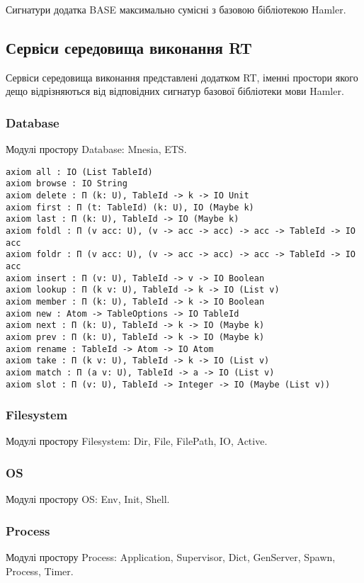 Сигнатури додатка BASE максимально сумісні з базовою бібліотекою Hamler.

\subsection{Сервіси середовища виконання RT}
Сервіси середовища виконання представлені додатком RT, іменні простори якого
дещо відрізняються від відповідних сигнатур базової бібліотеки мови Hamler.

\subsubsection{Database}
Модулі простору Database: Mnesia, ETS.

\begin{lstlisting}[mathescape=true]
axiom all : IO (List TableId)
axiom browse : IO String
axiom delete : Π (k: U), TableId -> k -> IO Unit
axiom first : Π (t: TableId) (k: U), IO (Maybe k)
axiom last : Π (k: U), TableId -> IO (Maybe k)
axiom foldl : Π (v acc: U), (v -> acc -> acc) -> acc -> TableId -> IO acc
axiom foldr : Π (v acc: U), (v -> acc -> acc) -> acc -> TableId -> IO acc
axiom insert : Π (v: U), TableId -> v -> IO Boolean
axiom lookup : Π (k v: U), TableId -> k -> IO (List v)
axiom member : Π (k: U), TableId -> k -> IO Boolean
axiom new : Atom -> TableOptions -> IO TableId
axiom next : Π (k: U), TableId -> k -> IO (Maybe k)
axiom prev : Π (k: U), TableId -> k -> IO (Maybe k)
axiom rename : TableId -> Atom -> IO Atom
axiom take : Π (k v: U), TableId -> k -> IO (List v)
axiom match : Π (a v: U), TableId -> a -> IO (List v)
axiom slot : Π (v: U), TableId -> Integer -> IO (Maybe (List v))
\end{lstlisting}

\subsubsection{Filesystem}
Модулі простору Filesystem: Dir, File, FilePath, IO, Active.

\subsubsection{OS}
Модулі простору OS: Env, Init, Shell.

\subsubsection{Process}
Модулі простору Process: Application, Supervisor, Dict, GenServer, Spawn, Process, Timer.

